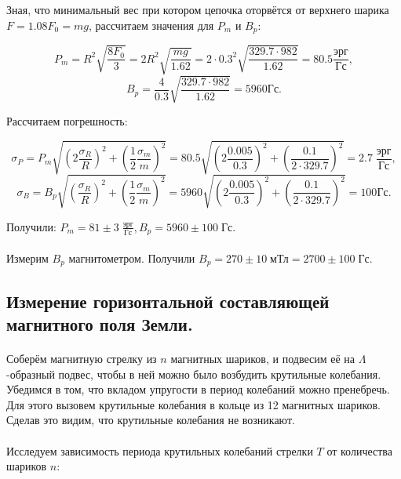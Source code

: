 \documentclass[a4paper,12pt]{article} %
\begin{document}
Зная, что минимальный вес при котором цепочка оторвётся от верхнего шарика $F = 1.08F_0 = mg$, рассчитаем значения для $P_m$ и $B_p$:

\[ P_m = R^2 \sqrt{\frac{8F_0}{3}} = 2 R^2 \sqrt{\frac{mg}{1.62}} = 2 \cdot 0.3^2 \sqrt{\frac{329.7 \cdot 982}{1.62}} = 80.5 \frac{\text{эрг}}{\text{Гс}},
\]
\[ B_p = \frac{4}{0.3} \sqrt{\frac{329.7 \cdot 982}{1.62}} = 5960 \text{Гс}.
\]

Рассчитаем погрешность:

\[ \sigma_P = P_m \sqrt{\left( 2 \frac{\sigma_R}{R} \right)^2 + \left( \frac{1}{2} \frac{\sigma_m}{m} \right)^2} = 80.5 \sqrt{\left( 2 \frac{0.005}{0.3} \right)^2 + \left( \frac{0.1}{2 \cdot 329.7} \right)^2} = 2.7 \; \frac{\text{эрг}}{\text{Гс}},
\]
\[ \sigma_B = B_p \sqrt{\left( \frac{\sigma_R}{R} \right)^2 + \left( \frac{1}{2} \frac{\sigma_m}{m} \right)^2} = 5960 \sqrt{\left( 2 \frac{0.005}{0.3} \right)^2 + \left( \frac{0.1}{2 \cdot 329.7} \right)^2} = 100 \text{Гс}.
\]

Получили: $P_m = 81 \pm 3 \; \frac{\text{эрг}}{\text{Гс}}, B_p = 5960 \pm 100 \; \text{Гс}$.

\paragraph{} Измерим $B_p$ магнитометром. Получили $B_p = 270 \pm 10 \; \text{мТл} = 2700 \pm 100 \; \text{Гс}$.


\subsection{Измерение горизонтальной составляющей магнитного поля Земли.}

\paragraph{} Соберём магнитную стрелку из $n$ магнитных шариков, и подвесим её на $\Lambda$-образный подвес, чтобы в ней можно было возбудить крутильные колебания. Убедимся в том, что вкладом упругости в период колебаний можно пренебречь. Для этого вызовем крутильные колебания в кольце из 12 магнитных шариков. Сделав это видим, что крутильные колебания не возникают.

\paragraph{} Исследуем зависимость периода крутильных колебаний стрелки $T$ от количества шариков $n$:
\end{document}
